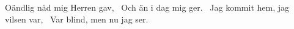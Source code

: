 Oändlig nåd mig Herren gav, 
Och än i dag mig ger. 
Jag kommit hem, jag vilsen var, 
Var blind, men nu jag ser. 
